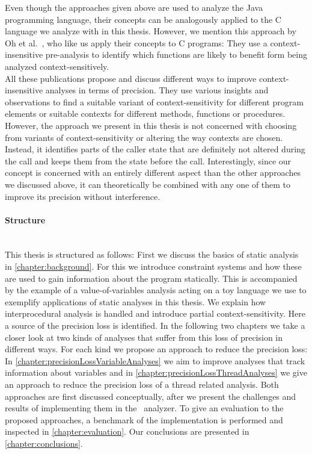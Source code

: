 Even though the approaches given above are used to analyze the Java programming language, their concepts can be analogously applied to the C language we analyze with \gob in this thesis. However, we mention this approach by Oh et al.~\parencite{oh2014selective}, who like us apply their concepts to C programs: They use a context-insensitive pre-analysis to identify which functions are likely to benefit form being analyzed context-sensitively.\\
All these publications propose and discuss different ways to improve context-insensitive analyses in terms of precision. They use various insights and observations to find a suitable variant of context-sensitivity for different program elements or suitable contexts for different methods, functions or procedures. However, the approach we present in this thesis is not concerned with choosing from variants of context-sensitivity or altering the way contexts are chosen. Instead, it identifies parts of the caller state that are definitely not altered during the call and keeps them from the state before the call. Interestingly, since our concept is concerned with an entirely different aspect than the other approaches we discussed above, it can theoretically be combined with any one of them to improve its precision without interference.

\paragraph{Structure}\mbox{}\\
This thesis is structured as follows: First we discuss the basics of static analysis in \autoref{chapter:background}. For this we introduce constraint systems and how these are used to gain information about the program statically. This is accompanied by the example of a value-of-variables analysis acting on a toy language we use to exemplify applications of static analyses in this thesis. We explain how interprocedural analysis is handled and introduce partial context-sensitivity. Here a source of the precision loss is identified. In the following two chapters we take a closer look at two kinds of analyses that suffer from this loss of precision in different ways. For each kind we propose an approach to reduce the precision loss: In \autoref{chapter:precisionLossVariableAnalyses} we aim to improve analyses that track information about variables and in \autoref{chapter:precisionLossThreadAnalyses} we give an approach to reduce the precision loss of a thread related analysis. Both approaches are first discussed conceptually, after we present the challenges and results of implementing them in the \gob\ analyzer. To give an evaluation to the proposed approaches, a benchmark of the implementation is performed and inspected in \autoref{chapter:evaluation}. Our conclusions are presented in \autoref{chapter:conclusions}.
